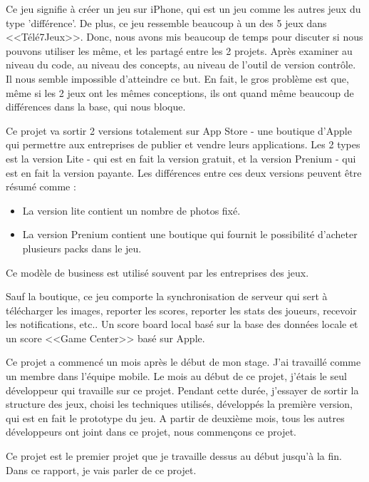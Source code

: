 Ce jeu signifie à créer un jeu sur iPhone, qui est un jeu comme les autres jeux du type 'différence'. De plus, ce jeu ressemble beaucoup à un des 5 jeux dans <<Télé7Jeux>>. Donc, nous avons mis beaucoup de temps pour discuter si nous pouvons utiliser les même, et les partagé entre les 2 projets. Après examiner au niveau du code, au niveau des concepts, au niveau de l'outil de version contrôle. Il nous semble impossible d'atteindre ce but. En fait, le gros problème est que, même si les 2 jeux ont les mêmes conceptions, ils ont quand même beaucoup de différences dans la base, qui nous bloque.

Ce projet va sortir 2 versions totalement sur App Store - une boutique d'Apple qui permettre aux entreprises de publier et vendre leurs applications. Les 2 types est la version Lite - qui est en fait la version gratuit, et la version Prenium - qui est en fait la version payante. Les différences entre ces deux versions peuvent être résumé comme :  \begin{itemize}  \item La version lite contient un nombre de photos fixé. 

\item La version Prenium contient une boutique qui fournit le possibilité d'acheter plusieurs packs dans le jeu. 
\end{itemize}
Ce modèle de business est utilisé souvent par les entreprises des jeux. 

Sauf la boutique, ce jeu comporte la synchronisation de serveur qui sert à télécharger les images, reporter les scores, reporter les stats des joueurs, recevoir les notifications, etc.. Un score board local basé sur la base des données locale et un score <<Game Center>> basé sur Apple.

Ce projet a commencé un mois après le début de mon stage. J'ai travaillé comme un membre dans l'équipe mobile. Le mois au début de ce projet, j'étais le seul développeur qui travaille sur ce projet. Pendant cette durée, j'essayer de sortir la structure des jeux, choisi les techniques utilisés, développés la première version, qui est en fait le prototype du jeu. A partir de deuxième mois, tous les autres développeurs ont joint dans ce projet, nous commençons ce projet.


Ce projet est le premier projet que je travaille dessus au début jusqu'à la fin. Dans ce rapport, je vais parler de ce projet.





